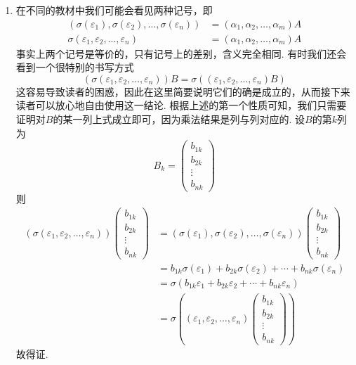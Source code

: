 \begin{enumerate}
    \item 在不同的教材中我们可能会看见两种记号，即
          \begin{align*}
              (\sigma(\varepsilon_1),\sigma(\varepsilon_2),\ldots,\sigma(\varepsilon_n))
              & =(\alpha_1,\alpha_2,\ldots,\alpha_m)A \\
              \sigma(\varepsilon_1,\varepsilon_2,\ldots,\varepsilon_n)
              & =(\alpha_1,\alpha_2,\ldots,\alpha_m)A
          \end{align*}
          事实上两个记号是等价的，只有记号上的差别，含义完全相同. 有时我们还会看到一个很特别的书写方式
          \begin{equation}\label{eq:7:基与矩阵的"结合律"}
            (\sigma(\varepsilon_1,\varepsilon_2,\ldots,\varepsilon_n))B
            =\sigma((\varepsilon_1,\varepsilon_2,\ldots,\varepsilon_n)B)
          \end{equation}
          这容易导致读者的困惑，因此在这里简要说明它们的确是成立的，从而接下来读者可以放心地自由使用这一结论. 根据上述的第一个性质可知，我们只需要证明对$B$的某一列上式成立即可，因为乘法结果是列与列对应的. 设$B$的第$k$列为
          \[B_k=\begin{pmatrix}
                  b_{1k} \\ b_{2k} \\ \vdots \\ b_{nk}
              \end{pmatrix}\]
          则
          \begin{align*}
              (\sigma(\varepsilon_1,\varepsilon_2,\ldots,\varepsilon_n))
              \begin{pmatrix}
                  b_{1k} \\ b_{2k} \\ \vdots \\ b_{nk}
              \end{pmatrix}
               & =(\sigma(\varepsilon_1),\sigma(\varepsilon_2),\ldots,\sigma(\varepsilon_n))\begin{pmatrix}
                   b_{1k} \\ b_{2k} \\ \vdots \\ b_{nk}
               \end{pmatrix}  \\
               & =b_{1k}\sigma(\varepsilon_1)+b_{2k}\sigma(\varepsilon_2)+\cdots+b_{nk}\sigma(\varepsilon_n)  \\
               & =\sigma(b_{1k}\varepsilon_1+b_{2k}\varepsilon_2+\cdots+b_{nk}\varepsilon_n)  \\
               & =\sigma((\varepsilon_1,\varepsilon_2,\ldots,\varepsilon_n)
              \begin{pmatrix}
                  b_{1k} \\ b_{2k} \\ \vdots \\ b_{nk}
              \end{pmatrix})
          \end{align*}
          故得证.
\end{enumerate}

